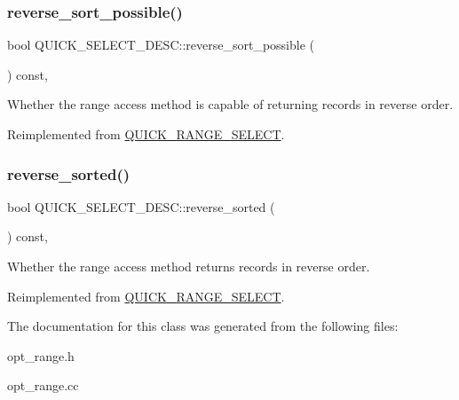 \subsubsection{\texorpdfstring{reverse\+\_\+sort\+\_\+possible()}{reverse\_sort\_possible()}}
{\footnotesize\ttfamily bool Q\+U\+I\+C\+K\+\_\+\+S\+E\+L\+E\+C\+T\+\_\+\+D\+E\+S\+C\+::reverse\+\_\+sort\+\_\+possible (\begin{DoxyParamCaption}{ }\end{DoxyParamCaption}) const\hspace{0.3cm}{\ttfamily [inline]}, {\ttfamily [virtual]}}

Whether the range access method is capable of returning records in reverse order. 

Reimplemented from \mbox{\hyperlink{classQUICK__RANGE__SELECT_a91c847083168b315d7a92d7e2e1d5485}{Q\+U\+I\+C\+K\+\_\+\+R\+A\+N\+G\+E\+\_\+\+S\+E\+L\+E\+CT}}.

\mbox{\label{classQUICK__SELECT__DESC_a1f9448b2def7b3aba93f9fbeee99a1cb}} 
\subsubsection{\texorpdfstring{reverse\+\_\+sorted()}{reverse\_sorted()}}
{\footnotesize\ttfamily bool Q\+U\+I\+C\+K\+\_\+\+S\+E\+L\+E\+C\+T\+\_\+\+D\+E\+S\+C\+::reverse\+\_\+sorted (\begin{DoxyParamCaption}{ }\end{DoxyParamCaption}) const\hspace{0.3cm}{\ttfamily [inline]}, {\ttfamily [virtual]}}

Whether the range access method returns records in reverse order. 

Reimplemented from \mbox{\hyperlink{classQUICK__RANGE__SELECT_a4673131942deb7ef48be474cfc4030e9}{Q\+U\+I\+C\+K\+\_\+\+R\+A\+N\+G\+E\+\_\+\+S\+E\+L\+E\+CT}}.



The documentation for this class was generated from the following files\+:\begin{DoxyCompactItemize}
\item 
opt\+\_\+range.\+h\item 
opt\+\_\+range.\+cc\end{DoxyCompactItemize}
